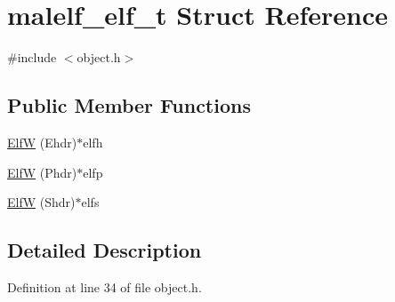 \hypertarget{structmalelf__elf__t}{
\section{malelf\_\-elf\_\-t Struct Reference}
\label{structmalelf__elf__t}
}


{\ttfamily \#include $<$object.h$>$}

\subsection*{Public Member Functions}
\begin{DoxyCompactItemize}
\item 
\hyperlink{structmalelf__elf__t_a3a2fcb24f1cc3aec9b6656953c391b2e}{ElfW} (Ehdr)$\ast$elfh
\item 
\hyperlink{structmalelf__elf__t_ad39aff9abba5f6394ccd48eca6cc02e3}{ElfW} (Phdr)$\ast$elfp
\item 
\hyperlink{structmalelf__elf__t_ab13051d50f844e065267c53816be9b08}{ElfW} (Shdr)$\ast$elfs
\end{DoxyCompactItemize}


\subsection{Detailed Description}


Definition at line 34 of file object.h.



